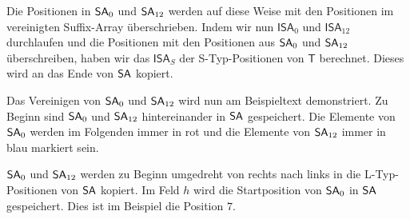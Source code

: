 Die Positionen in $\sa_0$ und $\sa_{12}$ werden auf diese Weise mit den Positionen im vereinigten Suffix-Array überschrieben. Indem wir nun $\mathsf{ISA}_0$ und $\mathsf{ISA}_{12}$ durchlaufen und die Positionen mit den Positionen aus $\sa_0$ und $\sa_{12}$ überschreiben, haben wir das $\mathsf{ISA}_S$ der S-Typ-Positionen von $\mathsf{T}$ berechnet. Dieses wird an das Ende von $\sa$ kopiert. \par
Das Vereinigen von $\sa_0$ und $\sa_{12}$ wird nun am Beispieltext demonstriert. Zu Beginn sind $\sa_0$ und $\sa_{12}$ hintereinander in $\sa$ gespeichert. Die Elemente von $\sa_0$ werden im Folgenden immer in rot und die Elemente von $\sa_{12}$ immer in blau markiert sein. 

\begin{table}[H]
	\footnotesize
	\centering
\end{table}

$\sa_0$ und $\sa_{12}$ werden zu Beginn umgedreht von rechts nach links in die L-Typ-Positionen von $\sa$ kopiert. Im Feld $h$ wird die Startposition von $\sa_0$ in $\sa$ gespeichert. Dies ist im Beispiel die Position $7$.

\begin{table}[H]
	\footnotesize
	\centering
\end{table}

